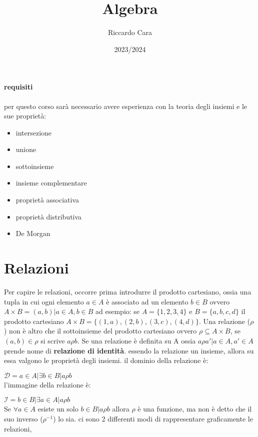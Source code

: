 \documentclass{article}
\title{Algebra}
\author{Riccardo Cara}
\date{2023/2024}
\begin{document}
\maketitle
\tableofcontents
\newpage
\paragraph{requisiti}
    per questo corso sarà necessario avere esperienza con la teoria degli insiemi e le sue proprietà:
    \begin{itemize}

        \item intersezione
        \item unione
        \item sottoinsieme
        \item insieme complementare
        \item proprietà associativa
        \item proprietà distributiva
        \item De Morgan
        
    \end{itemize}
\section{Relazioni}
    Per capire le relazioni, occorre prima introdurre il prodotto cartesiano, ossia una tupla in cui ogni elemento $a \in A$ è associato ad un elemento $b \in B$ ovvero $A\times B=(a,b) | a \in A, b\in B$ ad esempio:
    se $A=\{1,2,3,4\}$ e $B=\{a,b,c,d\}$ il prodotto cartesiano $A\times B=\{(1,a),(2,b),(3,c),(4,d)\}$.
    Una relazione ($\rho$) non è altro che il sottoinsieme del prodotto cartesiano ovvero $\rho \subseteq A \times B$, se $(a,b)\in \rho$ si scrive $a\rho b$. Se una relazione è definita su A ossia $ a\rho a'|a \in A, a' \in A$ prende nome di \textbf{relazione di identità}. essendo la relazione un insieme, allora su essa valgono le proprietà degli insiemi.
    il dominio della relazione è:

    $\mathcal{D}= a \in A | \exists b\in B | a\rho b$ \\
    l'immagine della relazione è: 

    $\mathcal{I}=b \in B |\exists a \in A | a\rho b$ \\
    Se $\forall a \in A$ esiste un solo $b\in B | a\rho b$ allora $\rho$ è una funzione, ma non è detto che il suo inverso ($\rho^{-1}$) lo sia.
    ci sono 2 differenti modi di rappresentare graficamente le relazioni,
\end{document}

